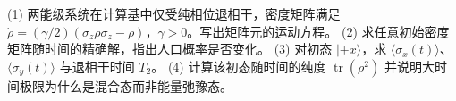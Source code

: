 (1) 两能级系统在计算基中仅受纯相位退相干，密度矩阵满足 \(\dot\rho=(\gamma/2)(\sigma_z\rho\sigma_z-\rho)\)，\(\gamma>0\)。写出矩阵元的运动方程。
(2) 求任意初始密度矩阵随时间的精确解，指出人口概率是否变化。
(3) 对初态 \(|+x\rangle\)，求 \(\langle\sigma_x(t)\rangle\)、\(\langle\sigma_y(t)\rangle\) 与退相干时间 \(T_2\)。
(4) 计算该初态随时间的纯度 \(\operatorname{tr}(\rho^2)\) 并说明大时间极限为什么是混合态而非能量弛豫态。
